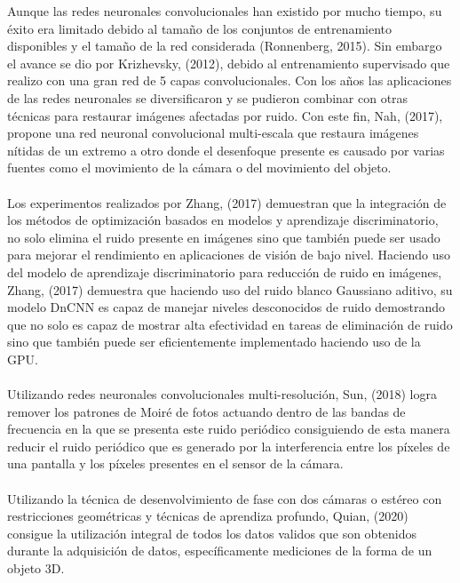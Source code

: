 \documentclass[10pt,letterpaper]{article}
\begin{document}
Aunque las redes neuronales convolucionales han existido por mucho tiempo, su éxito era limitado debido al tamaño de los conjuntos de entrenamiento disponibles y el tamaño de la red considerada (Ronnenberg, 2015)\cite{Ronn:Fisc}. Sin embargo el avance se dio por Krizhevsky, (2012)\cite{Kriz:Suts}, debido al entrenamiento supervisado que realizo con una gran red de 5 capas convolucionales. Con los años las aplicaciones de las redes neuronales se diversificaron y se pudieron combinar con otras técnicas para restaurar imágenes afectadas por ruido. Con este fin, Nah, (2017)\cite{Nah:Hyun}, propone una red neuronal convolucional multi-escala que restaura imágenes nítidas de un extremo a otro donde el desenfoque presente es causado por varias fuentes como el movimiento de la cámara o del movimiento del objeto.
\\\\  
Los experimentos realizados por Zhang, (2017)\cite{Zhang:Zuo1} demuestran que la integración de los métodos de optimización basados en modelos y aprendizaje discriminatorio, no solo elimina el ruido presente en imágenes sino que también puede ser usado para mejorar el rendimiento en aplicaciones de visión de bajo nivel. Haciendo uso del modelo de aprendizaje discriminatorio para reducción de ruido en imágenes, Zhang, (2017)\cite{Zhang:Zuo} demuestra que haciendo uso del ruido blanco Gaussiano aditivo, su modelo DnCNN es capaz de manejar niveles desconocidos de ruido demostrando que no solo es capaz de mostrar alta efectividad en tareas de eliminación de ruido sino que también puede ser eficientemente implementado haciendo uso de la GPU.
\\\\
Utilizando redes neuronales convolucionales multi-resolución, Sun, (2018)\cite{Sun:Yu} logra remover los patrones de Moiré de fotos actuando dentro de las bandas de frecuencia en la que se presenta este ruido periódico consiguiendo de esta manera reducir el ruido periódico que es generado por la interferencia entre los píxeles de una pantalla y los píxeles presentes en el sensor de la cámara.
\\\\
Utilizando la técnica de desenvolvimiento de fase con dos cámaras o estéreo con restricciones geométricas y técnicas de aprendiza profundo, Quian, (2020)\cite{Quian:} consigue la utilización integral de todos los datos validos que son obtenidos durante la adquisición de datos, específicamente mediciones de la forma de un objeto 3D. 
\\\\
\end{document}
